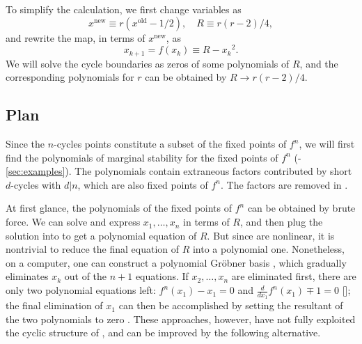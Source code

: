 \documentclass{ws-ijbc}
\begin{document}
To simplify the calculation, we first change variables \cite{mandelbrot, brown1} as
%
\[
    x^{\mathrm{new}} \equiv r(x^{\mathrm{old}} - 1/2),
    \quad R \equiv r(r-2)/4,
\]
%
and rewrite the map, in terms of $x^{\mathrm{new}}$, as
%
\begin{equation}
  x_{k+1} = f(x_k) \equiv R - {x_k}^2.
\label{eq:logmaps}
\end{equation}
%
%
We will solve the cycle boundaries as zeros of some polynomials of $R$,
and the corresponding polynomials for $r$ can be obtained by $R \rightarrow r(r-2)/4$.
%
%






\subsection{Plan}

Since the $n$-cycles points constitute
  a subset of the fixed points of $f^n$,
we will first find
  the polynomials of marginal stability
  for the fixed points of $f^n$
  (-\ref{sec:examples}).
The polynomials contain
  extraneous factors contributed by short $d$-cycles with $d|n$,
  which are also fixed points of $f^n$.
The factors are removed in .


At first glance, the polynomials of the fixed points of $f^n$
  can be obtained by brute force.
We can solve
   and express $x_1, \ldots, x_n$
  in terms of $R$,
  and then plug the solution into 
  to get a polynomial equation of $R$.
But since  are nonlinear,
  it is nontrivial to reduce the final equation of $R$
  into a polynomial one.
Nonetheless, on a computer, one can
  construct a polynomial Gr\"obner basis \cite{kk1},
  which gradually eliminates $x_k$ out of the $n+1$ equations.
If $x_2, \dots, x_n$ are eliminated first,
  there are only two polynomial equations left:
  $f^n(x_1) - x_1 = 0$
  and
  $\frac{d}{dx_1}f^n (x_1) \mp 1 = 0$
  [];
  the final elimination of $x_1$ can then be accomplished
  by setting the resultant of the two polynomials
  to zero \cite{burm}.
%
These approaches, however, have not fully
  exploited the cyclic structure of ,
  and can be improved by the following alternative.
\end{document}
